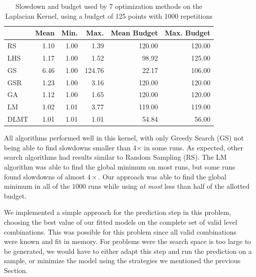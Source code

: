 \documentclass[conference]{IEEEtran}
\begin{document}
\begin{table}[ht]
\centering
\caption{Slowdown and budget used by 7 optimization methods on the Laplacian Kernel, using a budget of 125 points with 1000 repetitions}
\label{tab:gpu_laplacian_compare_budget}
\begingroup\footnotesize
\begin{tabular}{lrrrrr}
  \toprule
 & Mean & Min. & Max. & Mean Budget & Max. Budget \\
  \midrule
RS & 1.10 & 1.00 & 1.39 & 120.00 & 120.00 \\
  LHS & 1.17 & 1.00 & 1.52 & 98.92 & 125.00 \\
  GS & 6.46 & 1.00 & 124.76 & 22.17 & 106.00 \\
  GSR & 1.23 & 1.00 & 3.16 & 120.00 & 120.00 \\
  GA & 1.12 & 1.00 & 1.65 & 120.00 & 120.00 \\
  LM & 1.02 & 1.01 & 3.77 & 119.00 & 119.00 \\
   \rowcolor{red!25}DLMT & 1.01 & 1.01 & 1.01 & 54.84 & 56.00 \\
   \bottomrule
\end{tabular}
\endgroup
\end{table}

All algorithms performed well in this kernel, with only Greedy Search (GS)
not being able to find slowdowns smaller than 4\(\times\) in some runs. As
expected, other search algorithms had results similar to Random Sampling (RS).
The LM algorithm was able to find the global minimum on most runs, but some runs
found slowdowns of almost \(4\times\). Our approach was able to find the global
minimum in all of the 1000 runs while using \emph{at most} less than half of the
allotted budget.

We implemented a simple approach for the prediction step in this problem,
choosing the best value of our fitted models on the complete set of valid level
combinations. This was possible for this problem since all valid combinations
were known and fit in memory. For problems were the search space is too large to
be generated, we would have to either adapt this step and run the prediction on
a sample, or minimize the model using the strategies we mentioned the previous
Section.

\vspace{-10pt}
\end{document}
